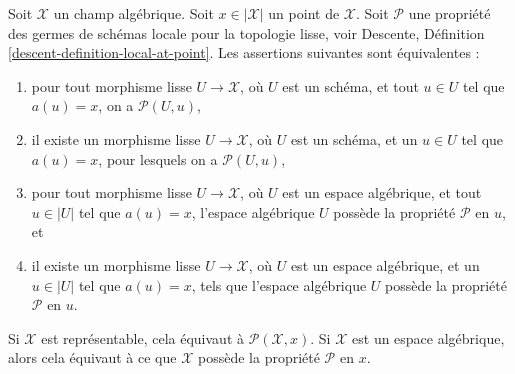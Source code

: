 \begin{lemma}
\label{lemma-local-source-target-at-point}
Soit $\mathcal{X}$ un champ algébrique.
Soit $x \in |\mathcal{X}|$ un point de $\mathcal{X}$.
Soit $\mathcal{P}$ une propriété des germes de schémas locale pour la topologie lisse, voir
Descente, Définition \ref{descent-definition-local-at-point}.
Les assertions suivantes sont équivalentes :
\begin{enumerate}
\item pour tout morphisme lisse $U \to \mathcal{X}$, où $U$ est un schéma,
et tout $u \in U$ tel que $a(u) = x$, on a $\mathcal{P}(U, u)$,
\item il existe un morphisme lisse $U \to \mathcal{X}$, où $U$ est un schéma,
et un $u \in U$ tel que $a(u) = x$, pour lesquels on a $\mathcal{P}(U, u)$,
\item pour tout morphisme lisse $U \to \mathcal{X}$, où $U$ est un espace algébrique,
et tout $u \in |U|$ tel que $a(u) = x$, l'espace algébrique $U$ possède la propriété
$\mathcal{P}$ en $u$, et
\item il existe un morphisme lisse $U \to \mathcal{X}$, où $U$ est un
espace algébrique, et un $u \in |U|$ tel que $a(u) = x$, tels que l'espace algébrique
$U$ possède la propriété $\mathcal{P}$ en $u$.
\end{enumerate}
Si $\mathcal{X}$ est représentable, cela équivaut à
$\mathcal{P}(\mathcal{X}, x)$. Si $\mathcal{X}$ est un espace algébrique, alors
cela équivaut à ce que $\mathcal{X}$ possède la propriété $\mathcal{P}$ en $x$.
\end{lemma}

